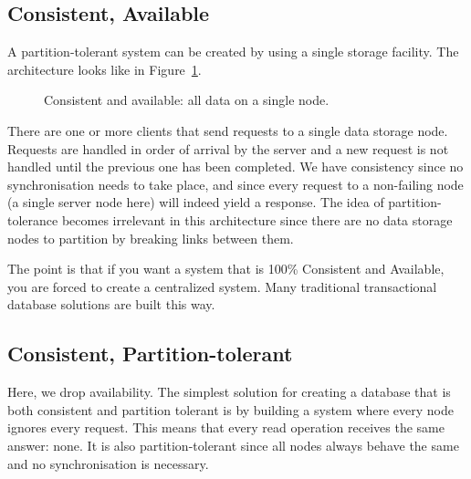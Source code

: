 \subsection{Consistent, Available}
A partition-tolerant system can be created by using a single storage
facility. The architecture looks like in Figure~\ref{fig:ca}.
\begin{figure}
\centering
{}
\caption{Consistent and available: all data on a single node.}
\label{fig:ca}
\end{figure}
There are one or more clients that send requests to a single data storage node.
Requests are handled in order of arrival by the server and a new request is not
handled until the previous one has been completed.  We have consistency since
no synchronisation needs to take place, and since every request to a
non-failing node (a single server node here) will indeed yield a response. The
idea of partition-tolerance becomes irrelevant in this architecture since there
are no data storage nodes to partition by breaking links between them.

The point is that if you want a system that is 100\% Consistent and Available,
you are forced to create a centralized system. Many traditional transactional
database solutions are built this way.

\subsection{Consistent, Partition-tolerant}
Here, we drop availability. The simplest solution for creating a database that
is both consistent and partition tolerant is by building a system where every
node ignores every request. This means that every read operation receives the
same answer: none. It is also partition-tolerant since all nodes always behave
the same and no synchronisation is necessary.

